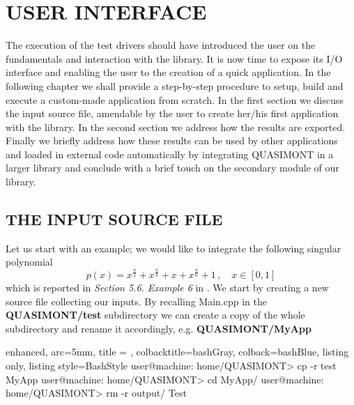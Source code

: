 \documentclass[a4paper, twosided]{book}
\begin{document}
\chapter[User interface]{\Huge \ttfamily USER INTERFACE}

The execution of the test drivers should have introduced the user on the fundamentals and interaction with the library. It is now time to expose its I/O interface and enabling the user to the creation of a quick application. In the following chapter we shall provide a step-by-step procedure to setup, build and execute a custom-made application from scratch. In the first section we discuss the input source file, amendable by the user to create her/his first application with the library. In the second section we address how the results are exported. Finally we briefly address how these results can be used by other applications and loaded in external code automatically by integrating QUASIMONT in a larger library and conclude with a brief touch on the secondary module of our library.

\section[The input source file]{\changefont THE INPUT SOURCE FILE}\label{Sec3.1}

Let us start with an example; we would like to integrate the following singular polynomial 
\begin{equation*}
    p(x) = x^{\frac{\pi}{2}} + x^{\frac{\pi}{3}} + x + x^{\frac{\pi}{6}} + 1\,,\quad x\in[0,1]
\end{equation*}
which is reported in \textsl{Section 5.6. Example 6} in \cite{Lombardi09}. We start by creating a new source file collecting our inputs. By recalling \colorbox{poliGrayBlue}{Main.cpp} in the \colorbox{poliGrayBlue}{\textbf{QUASIMONT/test}} subdirectory we can create a copy of the whole subdirectory and rename it accordingly, e.g. \colorbox{poliGrayBlue}{\textbf{QUASIMONT/MyApp}}

\vspace{0.5cm}
\begin{tcblisting}{enhanced,
                   arc=5mm,
                   title = \color{black}{\large \ttfamily Creation of application's directory},
                   colbacktitle=bashGray,
                   colback=bashBlue,
                   listing only,
                   listing style=BashStyle}
user@machine: home/QUASIMONT> cp -r test MyApp
user@machine: home/QUASIMONT> cd MyApp/
user@machine: home/QUASIMONT> rm -r output/ Test
\end{tcblisting}
\vspace{0.5cm}
\end{document}
